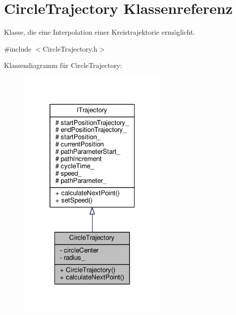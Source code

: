 \hypertarget{classCircleTrajectory}{\section{Circle\-Trajectory Klassenreferenz}
\label{classCircleTrajectory}
}


Klasse, die eine Interpolation einer Kreistrajektorie ermöglicht.  




{\ttfamily \#include $<$Circle\-Trajectory.\-h$>$}



Klassendiagramm für Circle\-Trajectory\-:
\nopagebreak
\begin{figure}[H]
\begin{center}
\leavevmode
\includegraphics[width=208pt]{classCircleTrajectory__inherit__graph}
\end{center}
\end{figure}


